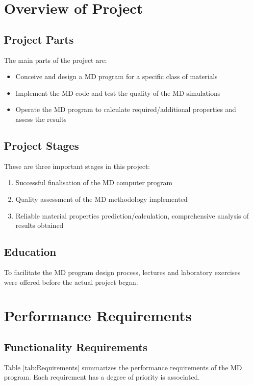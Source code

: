 \documentclass[12pt,a4paper]{article}
\begin{document}
\newpage
\section{Overview of Project}
\label{sec:Overview}

\subsection{Project Parts}
The main parts of the project are:
\begin{itemize}
\item Conceive and design a MD program for a specific class of materials
\item Implement the MD code and test the quality of the MD simulations
\item Operate the MD program to calculate required/additional properties and assess the results
\end{itemize}

\subsection{Project Stages}
These are three important stages in this project:
\begin{enumerate}
\item Successful finalisation of the MD computer program
\item Quality assessment of the MD methodology implemented
\item Reliable material properties prediction/calculation, comprehensive analysis of results obtained
\end{enumerate}

\subsection{Education}
To facilitate the MD program design process, lectures and laboratory exercises were offered before the actual project began.

\newpage
\section{Performance Requirements}

\subsection{Functionality Requirements}
Table \ref{tab:Requirements} summarizes the performance requirements of the MD program. Each requirement has a degree of priority is associated.
\end{document}
